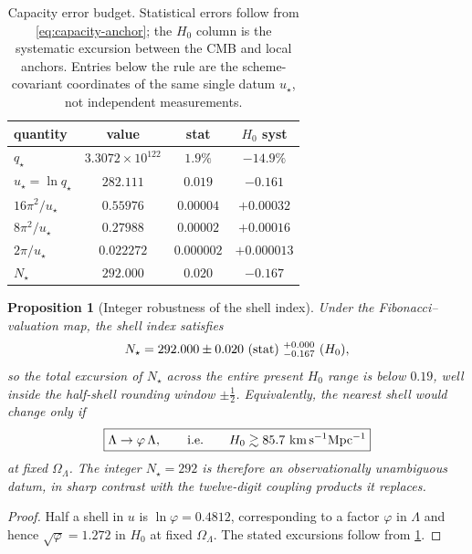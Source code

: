 \documentclass[aps,prd,reprint,nofootinbib,superscriptaddress,floatfix]{revtex4-2}
\numberwithin{equation}{section}
\theoremstyle{definition}
\theoremstyle{plain}
\newtheorem{proposition}{Proposition}[section]
\begin{document}
\begin{table}[!htbp]
\caption{Capacity error budget.  Statistical errors follow from
\cref{eq:capacity-anchor}; the \(H_0\) column is the systematic excursion
between the CMB and local anchors.  Entries below the rule are the
scheme-covariant coordinates of the same single datum \(u_\star\), not
independent measurements.}
\label{tab:error-budget}
\begin{ruledtabular}
\begin{tabular}{lccc}
quantity & value & stat & \(H_0\) syst\\
\hline
\(q_\star\) & \(3.3072\times10^{122}\) & \(1.9\%\) & \(-14.9\%\)\\
\(u_\star=\ln q_\star\) & \(282.111\) & \(0.019\) & \(-0.161\)\\
\hline
\(16\pi^2/u_\star\) & \(0.55976\) & \(0.00004\) & \(+0.00032\)\\
\(8\pi^2/u_\star\) & \(0.27988\) & \(0.00002\) & \(+0.00016\)\\
\(2\pi/u_\star\) & \(0.022272\) & \(0.000002\) & \(+0.000013\)\\
\(N_\star\) & \(292.000\) & \(0.020\) & \(-0.167\)\\
\end{tabular}
\end{ruledtabular}
\end{table}

\begin{proposition}[Integer robustness of the shell index]
\label{prop:shell-robustness}
Under the Fibonacci--valuation map, the shell index satisfies
\begin{equation}
N_\star=292.000\pm0.020\ ({\rm stat})\ ^{+0.000}_{-0.167}\ (H_0),
\end{equation}
so the total excursion of \(N_\star\) across the entire present
\(H_0\) range is below \(0.19\), well inside the half-shell rounding window
\(\pm\tfrac12\).  Equivalently, the nearest shell would change only if
\begin{equation}
\boxed{
\Lambda\to\varphi\,\Lambda,
\qquad\text{i.e.}\qquad
H_0\gtrsim85.7\ {\rm km\,s^{-1}Mpc^{-1}}
}
\end{equation}
at fixed \(\Omega_\Lambda\).  The integer \(N_\star=292\) is therefore an
observationally unambiguous datum, in sharp contrast with the twelve-digit
coupling products it replaces.
\end{proposition}

\begin{proof}
Half a shell in \(u\) is \(\ln\varphi=0.4812\), corresponding to a factor
\(\varphi\) in \(\Lambda\) and hence \(\sqrt\varphi=1.272\) in \(H_0\) at fixed
\(\Omega_\Lambda\).  The stated excursions follow from
\cref{tab:error-budget}.
\end{proof}
\end{document}
